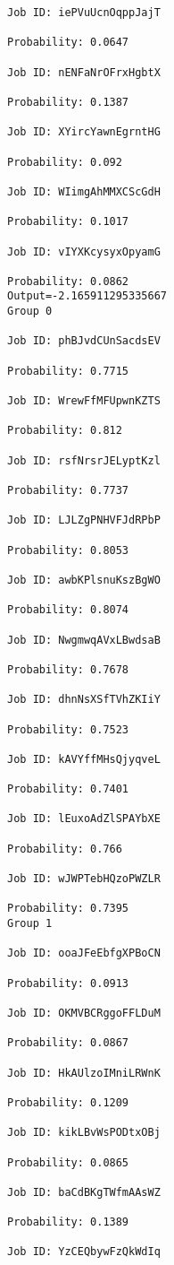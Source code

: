 \documentclass[11pt]{article}
\begin{document}
\begin{Verbatim}[commandchars=\\\{\}]
Job ID: iePVuUcnOqppJajT

Probability: 0.0647

Job ID: nENFaNrOFrxHgbtX

Probability: 0.1387

Job ID: XYircYawnEgrntHG

Probability: 0.092

Job ID: WIimgAhMMXCScGdH

Probability: 0.1017

Job ID: vIYXKcysyxOpyamG

Probability: 0.0862
Output=-2.165911295335667
Group 0

Job ID: phBJvdCUnSacdsEV

Probability: 0.7715

Job ID: WrewFfMFUpwnKZTS

Probability: 0.812

Job ID: rsfNrsrJELyptKzl

Probability: 0.7737

Job ID: LJLZgPNHVFJdRPbP

Probability: 0.8053

Job ID: awbKPlsnuKszBgWO

Probability: 0.8074

Job ID: NwgmwqAVxLBwdsaB

Probability: 0.7678

Job ID: dhnNsXSfTVhZKIiY

Probability: 0.7523

Job ID: kAVYffMHsQjyqveL

Probability: 0.7401

Job ID: lEuxoAdZlSPAYbXE

Probability: 0.766

Job ID: wJWPTebHQzoPWZLR

Probability: 0.7395
Group 1

Job ID: ooaJFeEbfgXPBoCN

Probability: 0.0913

Job ID: OKMVBCRggoFFLDuM

Probability: 0.0867

Job ID: HkAUlzoIMniLRWnK

Probability: 0.1209

Job ID: kikLBvWsPODtxOBj

Probability: 0.0865

Job ID: baCdBKgTWfmAAsWZ

Probability: 0.1389

Job ID: YzCEQbywFzQkWdIq


\end{Verbatim}
\end{document}
